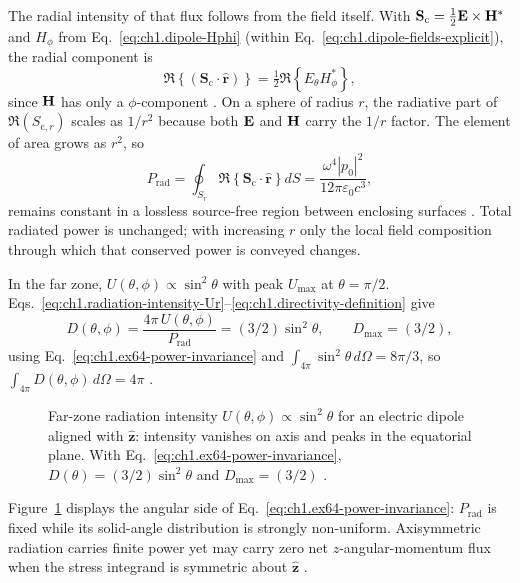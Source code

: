 The radial intensity of that flux follows from the field itself. With
$\mathbf{S}_\mathrm{c}=\tfrac12\mathbf{E}\times\mathbf{H}^*$ and $H_\phi$ from
Eq.~\eqref{eq:ch1.dipole-Hphi} (within Eq.~\eqref{eq:ch1.dipole-fields-explicit}), the radial component is
\begin{equation}
\label{eq:ch1.dipole-sc-radial}
\Re\!\left\{(\mathbf{S}_\mathrm{c}\cdot\hat{\mathbf{r}})\right\}
=\tfrac12\Re\!\left\{E_\theta H_\phi^*\right\},
\end{equation}
since $\mathbf{H}$ has only a $\phi$-component \cite{stratton1941}.
On a sphere of radius $r$, the radiative part of $\Re(S_{\mathrm{c},r})$ scales as $1/r^2$ because both $\mathbf{E}$ and $\mathbf{H}$ carry the $1/r$ factor. The element of area grows as $r^2$, so
\begin{equation}
\label{eq:ch1.ex64-power-invariance}
P_{\mathrm{rad}}=\oint_{S_r}\Re\!\left\{\mathbf{S}_\mathrm{c}\cdot\hat{\mathbf{r}}\right\}dS
=\frac{\omega^4|p_0|^2}{12\pi\varepsilon_0 c^3},
\end{equation}
remains constant in a lossless source-free region between enclosing surfaces \cite{stratton1941}. Total radiated power is unchanged; with increasing $r$ only the local field composition through which that conserved power is conveyed changes.

In the far zone, $U(\theta,\phi)\propto\sin^2\theta$ with peak $U_{\max}$ at $\theta=\pi/2$. Eqs.~\eqref{eq:ch1.radiation-intensity-Ur}--\eqref{eq:ch1.directivity-definition} give
\[
D(\theta,\phi)=\frac{4\pi\,U(\theta,\phi)}{P_{\mathrm{rad}}}
=(3/2)\sin^2\theta,\qquad D_{\max}=(3/2),
\]
using Eq.~\eqref{eq:ch1.ex64-power-invariance} and $\int_{4\pi}\sin^2\theta\,d\Omega=8\pi/3$, so $\int_{4\pi}D(\theta,\phi)\,d\Omega=4\pi$ \cite{stratton1941,harrington2001}.

\begin{figure}[t]
\centering
\VolIPhysFig{\VolIPhysDipoleRadiationPattern}
\caption{Far-zone radiation intensity $U(\theta,\phi)\propto\sin^2\theta$ for an electric dipole aligned with $\hat{\mathbf{z}}$: intensity vanishes on axis and peaks in the equatorial plane. With Eq.~\eqref{eq:ch1.ex64-power-invariance}, $D(\theta)=(3/2)\sin^2\theta$ and $D_{\max}=(3/2)$ \cite{stratton1941,harrington2001}.}
\label{fig:ch1.dipole-radiation-pattern}
\end{figure}

Figure~\ref{fig:ch1.dipole-radiation-pattern} displays the angular side of Eq.~\eqref{eq:ch1.ex64-power-invariance}: $P_{\mathrm{rad}}$ is fixed while its solid-angle distribution is strongly non-uniform. Axisymmetric radiation carries finite power yet may carry zero net $z$-angular-momentum flux when the stress integrand is symmetric about $\hat{\mathbf{z}}$ \cite{beth1936}.

